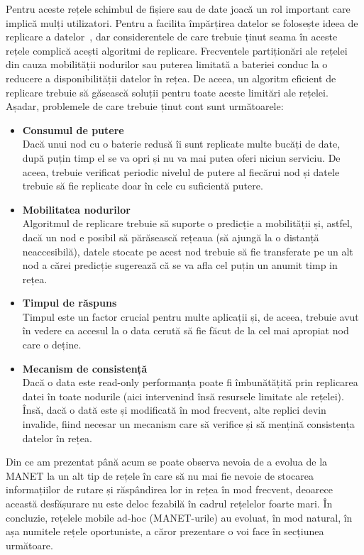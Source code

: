 \documentclass[12pt,a4paper]{report}
\begin{document}
Pentru aceste rețele schimbul de fișiere sau de date joacă un rol important care implică mulți utilizatori. Pentru a facilita împărțirea datelor se folosește ideea de replicare a datelor~\cite{CDRA}, dar considerentele de care trebuie ținut seama în aceste rețele complică acești algoritmi de replicare. Frecventele partiționări ale rețelei din cauza mobilității nodurilor sau puterea limitată a bateriei conduc la o reducere a disponibilității datelor în rețea. De aceea, un algoritm eficient de replicare trebuie să găsească soluții pentru toate aceste limitări ale rețelei. Așadar, problemele de care trebuie ținut cont sunt următoarele:
\begin{itemize}
	\item\textbf{Consumul de putere} \hfill \\
	Dacă unui nod cu o baterie redusă îi sunt replicate multe bucăți de date, după puțin timp el se va opri și nu va mai putea oferi niciun serviciu. De aceea, trebuie verificat periodic nivelul de putere al fiecărui nod și datele trebuie să fie replicate doar în cele cu suficientă putere.
	\item\textbf{Mobilitatea nodurilor} \hfill \\
	Algoritmul de replicare trebuie să suporte o predicție a mobilității și, astfel, dacă un nod e posibil să părăsească rețeaua (să ajungă la o distanță neaccesibilă), datele stocate pe acest nod trebuie să fie transferate pe un alt nod a cărei predicție sugerează că se va afla cel puțin un anumit timp in rețea.
	\item\textbf{Timpul de răspuns} \hfill \\
	Timpul este un factor crucial pentru multe aplicații și, de aceea, trebuie avut în vedere ca accesul la o data cerută să fie făcut de la cel mai apropiat nod care o deține.
	\item\textbf{Mecanism de consistență} \hfill \\
	Dacă o data este read-only performanța poate fi îmbunătățită prin replicarea datei în toate nodurile (aici intervenind însă resursele limitate ale rețelei). Însă, dacă o dată este și modificată în mod frecvent, alte replici devin invalide, fiind necesar un mecanism care să verifice și să mențină consistența datelor în rețea.
\end{itemize}
Din ce am prezentat până acum se poate observa nevoia de a evolua de la MANET la un alt tip de rețele în care să nu mai fie nevoie de stocarea informațiilor de rutare și răspândirea lor in rețea în mod frecvent, deoarece această desfășurare nu este deloc fezabilă în cadrul rețelelor foarte mari. În concluzie, rețelele mobile ad-hoc (MANET-urile) au evoluat, în mod natural, în așa numitele rețele oportuniste, a căror prezentare o voi face în secțiunea următoare.
\fi
\end{document}
